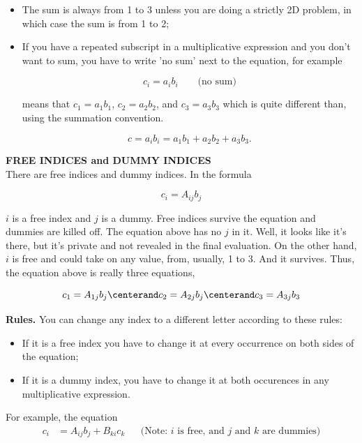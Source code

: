 \documentclass[11pt]{article}
\begin{document}
\begin{enumerate}
\begin{itemize}
\bigskip
\begin{quotation}\noindent
{\bf
From this point on in this course, unless stated otherwise, we are using the summation convention.}
\end{quotation}



\item The sum is always from 1 to 3 unless you are doing a strictly 2D problem, in which case the sum is from 1 to 2;
\item If you have a repeated subscript in a multiplicative expression and you don't want to sum, you have to write 'no sum' next to the equation, for example

\[
c_i = a_ib_i \qquad \mbox{(no sum)}
\]

means that $c_1 = a_1b_1$, $c_2 = a_2b_2$, and $c_3 = a_3b_3$ which is quite different than, using the summation convention.


\[
c = a_ib_i = a_1b_1 + a_2b_2 + a_3b_3.
\]
\end{itemize}



\medskip
\textbf{FREE INDICES and DUMMY INDICES}
\null\\
There are free indices and dummy indices.  In the formula 

\[
  c_i = A_{ij}b_j
\]

$i$ is a free index and $j$ is a dummy.  Free indices survive the equation and dummies are killed off.
The equation above has no $j$ in it. Well, it looks like it's there, but it's private and not revealed in the final evaluation.   On the other hand, $i$ is free and could take on any value,
from, usually, 1 to 3.  And it survives. Thus, the equation above is really three equations,


\[
  c_1= A_{1j}b_j\centerand  
  c_2 = A_{2j}b_j\centerand
  c_3 = A_{3j}b_3 
 \]
 
\textbf{ Rules.} You can change any index to a different letter according to these rules:
 
 \begin{itemize}
 \item If it is a free index you have to change it at every occurrence on both sides of the equation;
 \item If it is a dummy index, you have to change it at both occurences in any multiplicative expression.
 \end{itemize} 
 
 For example, the equation
 \begin{align*}
 c_i &= A_{ij}b_j  + B_{ki}c_k &&\mbox{(Note: $i$ is free, and $j$ and $k$ are dummies)}\\
 \end{align*}
 

\end{enumerate}
\end{document}
